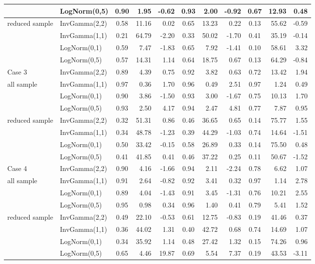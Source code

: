 \documentclass{amsart}
\begin{document}
\begin{table}[ht]
{\begin{tabular}{ll|crr|crr|crr}
			& LogNorm(0,5) & 0.90 & 1.95 & -0.62 & 0.93 & 2.00 & -0.92 & 0.67 & 12.93 & 0.48 \\ 
			\midrule
			reduced sample & InvGamma(2,2) & 0.58 & 11.16 & 0.02 & 0.65 & 13.23 & 0.22 & 0.13 & 55.62 & -0.59 \\ 
			& InvGamma(1,1) & 0.21 & 64.79 & -2.20 & 0.33 & 50.02 & -1.70 & 0.41 & 35.19 & -0.14 \\ 
			& LogNorm(0,1) & 0.59 & 7.47 & -1.83 & 0.65 & 7.92 & -1.41 & 0.10 & 58.61 & 3.32 \\ 
			& LogNorm(0,5) & 0.57 & 14.31 & 1.14 & 0.64 & 18.75 & 0.67 & 0.13 & 64.29 & -0.84 \\ 
			\midrule
			Case 3 & InvGamma(2,2) & 0.89 & 4.39 & 0.75 & 0.92 & 3.82 & 0.63 & 0.72 & 13.42 & 1.94 \\ 
			all sample & InvGamma(1,1) & 0.97 & 0.36 & 1.70 & 0.96 & 0.49 & 2.51 & 0.97 & 1.24 & 0.49 \\ 
			& LogNorm(0,1) & 0.90 & 3.86 & -1.50 & 0.93 & 3.00 & -1.67 & 0.75 & 10.13 & 1.70 \\ 
			& LogNorm(0,5) & 0.93 & 2.50 & 4.17 & 0.94 & 2.47 & 4.81 & 0.77 & 7.87 & 0.95 \\ 
			\midrule
			reduced sample & InvGamma(2,2) & 0.32 & 51.31 & 0.86 & 0.46 & 36.65 & 0.65 & 0.14 & 75.77 & 1.55 \\ 
			& InvGamma(1,1) & 0.34 & 48.78 & -1.23 & 0.39 & 44.29 & -1.03 & 0.74 & 14.64 & -1.51 \\ 
			& LogNorm(0,1) & 0.50 & 33.42 & -0.15 & 0.58 & 26.89 & 0.33 & 0.14 & 75.50 & 0.48 \\ 
			& LogNorm(0,5) & 0.41 & 41.85 & 0.41 & 0.46 & 37.22 & 0.25 & 0.11 & 50.67 & -1.52 \\ 
			\midrule
			Case 4 & InvGamma(2,2) & 0.90 & 4.16 & -1.66 & 0.94 & 2.11 & -2.24 & 0.78 & 6.62 & 1.07 \\ 
			all sample & InvGamma(1,1) & 0.91 & 2.64 & -0.82 & 0.92 & 3.41 & 0.32 & 0.97 & 1.14 & 2.78 \\ 
			& LogNorm(0,1) & 0.89 & 4.04 & -1.43 & 0.91 & 3.45 & -1.31 & 0.76 & 10.21 & 2.55 \\ 
			& LogNorm(0,5) & 0.95 & 0.98 & 0.34 & 0.96 & 1.40 & 0.41 & 0.79 & 5.41 & 1.52 \\ 
			\midrule
			reduced sample & InvGamma(2,2) & 0.49 & 22.10 & -0.53 & 0.61 & 12.75 & -0.83 & 0.19 & 41.46 & 0.37 \\ 
			& InvGamma(1,1) & 0.36 & 44.02 & 1.31 & 0.40 & 42.72 & 0.68 & 0.74 & 14.69 & 1.07 \\ 
			& LogNorm(0,1) & 0.34 & 35.92 & 1.14 & 0.48 & 27.42 & 1.32 & 0.15 & 74.26 & 0.96 \\ 
			& LogNorm(0,5) & 0.65 & 4.46 & 19.87 & 0.69 & 5.54 & 7.37 & 0.19 & 43.53 & -3.11 \\ 
			\bottomrule
	\end{tabular}}
\end{table}
\end{document}
